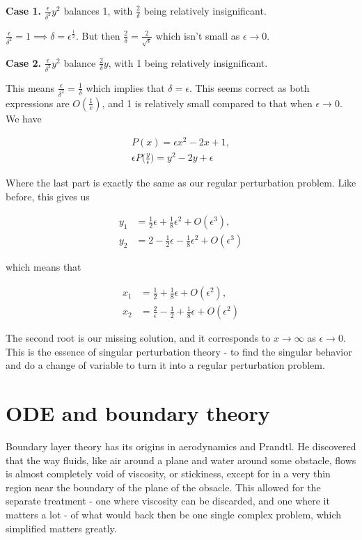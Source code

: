 \documentclass[12pt]{article}
\begin{document}
\textbf{Case 1.} $\frac{\epsilon}{\delta^2} y^2$ balances 1, with $\frac{2}{\delta}$
being relatively insignificant.

$\frac{\epsilon}{\delta^2} = 1 \implies \delta = \epsilon^{\frac{1}{2}}$. But
then $\frac{2}{\delta} = \frac{2}{\sqrt{\epsilon}}$ which isn't small as
$\epsilon \to 0$.

\textbf{Case 2.} $\frac{\epsilon}{\delta^2} y^2$ balance $\frac{2}{\delta} y$,
with 1 being relatively insignificant.

This means $\frac{\epsilon}{\delta^2} = \frac{1}{\delta}$ which implies that
$\delta = \epsilon$. This seems correct as both expressions are
$O(\frac{1}{e})$, and 1 is relatively small compared to that when $\epsilon \to
0$. We have

\begin{align}
P(x) = \epsilon x^2 - 2x + 1, \\
\epsilon P\Big(\frac{y}{\epsilon}\Big) = y^2 - 2 y + \epsilon
\end{align}

Where the last part is exactly the same as our regular perturbation problem.
Like before, this gives us

\begin{align}
y_1 &= \frac{1}{2} \epsilon + \frac{1}{8} \epsilon^2 + O(\epsilon^3), \\
y_2 &= 2 - \frac{1}{2} \epsilon - \frac{1}{8} \epsilon^2 + O(\epsilon^3)
\end{align}

which means that

\begin{align}
x_1 &= \frac{1}{2} + \frac{1}{8} \epsilon + O(\epsilon^2), \\
x_2 &= \frac{2}{\epsilon} - \frac{1}{2} + \frac{1}{8} \epsilon + O(\epsilon^2)
\end{align}

The second root is our missing solution, and it corresponds to $x \to \infty$ as
$\epsilon \to 0$. This is the essence of singular perturbation theory - to find
the singular behavior and do a change of variable to turn it into a regular
perturbation problem.

\section{ODE and boundary theory}

Boundary layer theory has its origins in aerodynamics and Prandtl. He
discovered that the way fluids, like air around a plane and water
around some obstacle, flows is almost completely void of viscosity, or
stickiness, except for in a very thin region near the boundary of the
plane of the obsacle. This allowed for the separate treatment - one
where viscosity can be discarded, and one where it matters a lot - of
what would back then be one single complex problem, which simplified
matters greatly.
\end{document}
